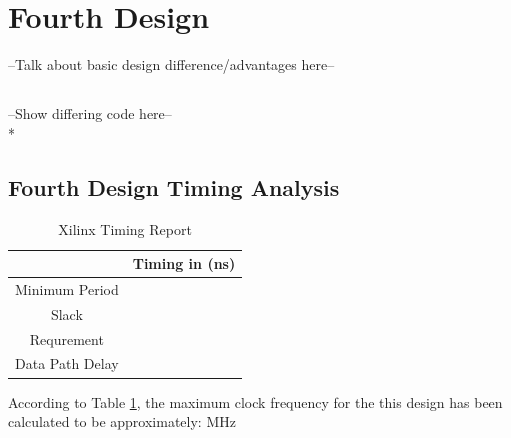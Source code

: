 \section*{Fourth Design}
--Talk about basic design difference/advantages here-- 

\subsection*{}
--Show differing code here-- \\*



\subsection*{Fourth Design Timing Analysis}

\begin{table}[bh]
\caption{Xilinx Timing Report}
\begin{tabular}{c|c}
\centering
           & Timing in (ns) \\
\hline
Minimum Period &     \\

     Slack &     \\

Requrement &        \\

Data Path Delay &     \\
\end{tabular}  
\label{tab:timing4}
\end{table}

According to Table \ref{tab:timing4}, the maximum clock frequency for the this design has been calculated to be approximately:  MHz


